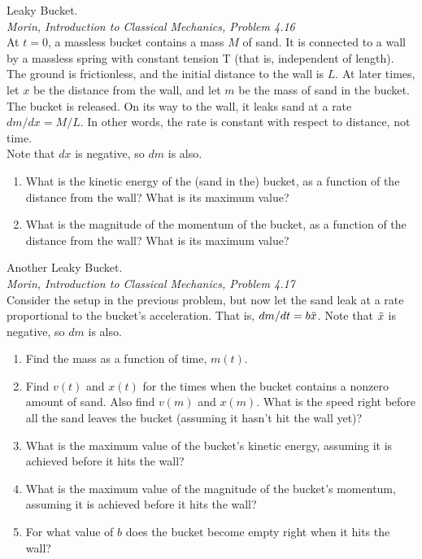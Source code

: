 \documentclass[11pt]{article}
\theoremstyle{gangnamstyle}{\newtheorem{definition}{Definition}[]}
\theoremstyle{gangnamstyle}{\newtheorem{example}{Example}[]}
\theoremstyle{gangnamstyle}{\newtheorem{problem}{Problem}[]}
\theoremstyle{gangnamstyle}{\newtheorem{warning}{Warning}[]}
\begin{document}
\begin{problem}
Leaky Bucket. \\
\textit{Morin, Introduction to Classical Mechanics, Problem 4.16} \\
At $t = 0$, a massless bucket contains a mass $M$ of sand. It is connected to a wall by a massless spring with constant tension T (that is, independent of length). The ground is frictionless, and the initial distance to the wall is $L$. At later times, let $x$ be the distance from the wall, and let $m$
be the mass of sand in the bucket. The bucket is released. On its way to the wall, it leaks sand at a rate $dm/dx = M/L$. In other words, the rate is constant with respect to distance, not time. \\
Note that $dx$ is negative, so $dm$ is also.
\begin{enumerate}
\item What is the kinetic energy of the (sand in the) bucket, as a function of the distance from the wall? What is its maximum value? \\
\item What is the magnitude of the momentum of the bucket, as a function of the distance from the wall? What is its maximum value?
\end{enumerate}
\end{problem}

\begin{problem}
Another Leaky Bucket. \\
\textit{Morin, Introduction to Classical Mechanics, Problem 4.17} \\
Consider the setup in the previous problem, but now let the sand leak at a rate proportional to the bucket’s acceleration. That is, $dm/dt = b\Ddot{x}$. Note that $\Ddot{x}$ is negative, so $dm$ is also.
\begin{enumerate}
\item Find the mass as a function of time, $m(t)$.
\item Find $v(t)$ and $x(t)$ for the times when the bucket contains a nonzero amount of sand. Also find $v(m)$ and $x(m)$. What is the speed right before all the sand leaves the bucket (assuming it hasn’t hit the wall yet)?
\item What is the maximum value of the bucket’s kinetic energy, assuming it is achieved before it hits the wall?
\item What is the maximum value of the magnitude of the bucket’s momentum, assuming it is achieved before it hits the wall?
\item For what value of $b$ does the bucket become empty right when it hits the wall?
\end{enumerate}
\end{problem}
\end{document}
